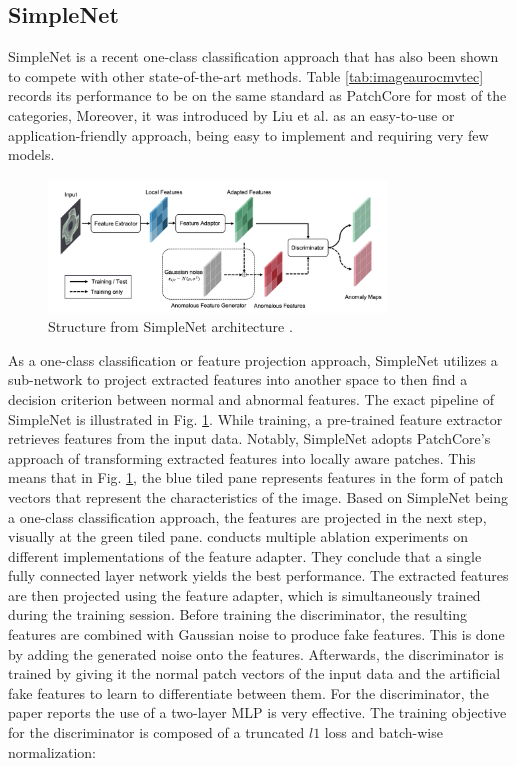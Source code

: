 \subsection{SimpleNet}
\label{subsec:simplenet}
SimpleNet \cite{liu2023simplenet} is a recent one-class classification approach that has also been shown to compete with other state-of-the-art methods. Table \ref{tab:imageaurocmvtec} records its performance to be on the same standard as PatchCore 
for most of the categories, %
Moreover, it was introduced by Liu et al. as an easy-to-use or application-friendly approach, being easy to implement and requiring very few models.

\begin{figure}[H]
\centering
\includegraphics[width=0.8\textwidth]{figures/simplenet_architecture.png}
\caption{Structure from SimpleNet architecture \cite{liu2023simplenet}.}
\label{fig:simplenetpipeline}
\end{figure}

As a one-class classification or feature projection approach, SimpleNet utilizes a sub-network to project extracted features into another space to then find a decision criterion between normal and 
abnormal features. The exact pipeline of SimpleNet is illustrated in Fig. \ref{fig:simplenetpipeline}. While training, a pre-trained feature extractor retrieves features from the input data. Notably, SimpleNet adopts PatchCore's approach of transforming extracted features into locally aware patches. This means that in Fig. \ref{fig:simplenetpipeline}, the blue tiled pane represents features in the form of patch vectors 
that represent the characteristics of the image. Based on SimpleNet being a one-class classification approach, the features are projected in the next step, visually at the green tiled pane. 
\cite{liu2023simplenet} conducts multiple ablation experiments on different implementations of the feature adapter. They conclude that a single fully connected layer network yields the best 
performance. The extracted features are then projected using the feature adapter, which is simultaneously trained during the training session. Before training the discriminator, the resulting 
features are combined with Gaussian noise to produce fake features. This is done by adding the generated noise onto the features. Afterwards, the discriminator is trained by giving it 
the normal patch vectors of the input data and the artificial fake features to learn to differentiate between them. For the discriminator, the paper reports the use of a two-layer 
MLP is very effective. The training objective for the discriminator is composed of a truncated $l1$ loss and batch-wise normalization:

